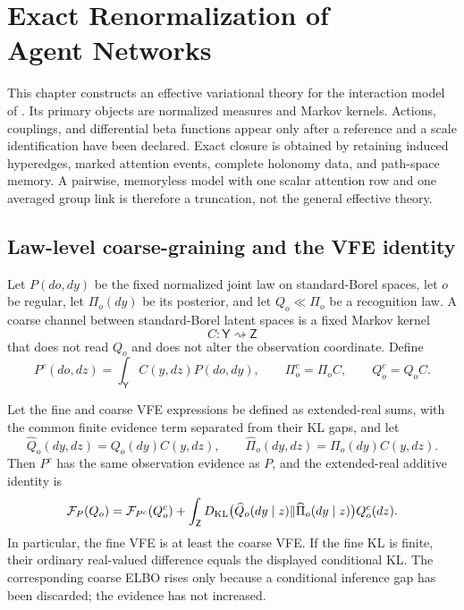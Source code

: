 \chapter[Exact Agent-Network Renormalization]{Exact Renormalization of\\Agent Networks}
\label{ch:agent-network-rg}

This chapter constructs an effective variational theory for the interaction
model of .  Its primary objects are normalized
measures and Markov kernels.  Actions, couplings, and differential beta
functions appear only after a reference and a scale identification have been
declared.  Exact closure is obtained by retaining induced hyperedges, marked
attention events, complete holonomy data, and path-space memory.  A pairwise,
memoryless model with one scalar attention row and one averaged group link is
therefore a truncation, not the general effective theory.

\section{Law-level coarse-graining and the VFE identity}
\label{sec:rg-law-level-vfe}

Let $P(do,dy)$ be the fixed normalized joint law on standard-Borel spaces, let
$o$ be regular, let $\Pi_o(dy)$ be its posterior, and let
$Q_o\ll\Pi_o$ be a recognition law.  A coarse channel between standard-Borel
latent spaces is a fixed Markov kernel
\begin{equation}
C:\mathsf Y\rightsquigarrow\mathsf Z
\label{eq:rg-coarse-channel}
\end{equation}
that does not read $Q_o$ and does not alter the observation coordinate.  Define
\begin{equation}
P^c(do,dz)=\int_{\mathsf Y}C(y,dz)P(do,dy),
\qquad
\Pi_o^c=\Pi_oC,
\qquad
Q_o^c=Q_oC.
\label{eq:rg-common-pushforward}
\end{equation}

Let the fine and coarse VFE expressions be defined as extended-real sums, with
the common finite evidence term separated from their KL gaps, and let
\begin{equation}
\widehat Q_o(dy,dz)=Q_o(dy)C(y,dz),
\qquad
\widehat\Pi_o(dy,dz)=\Pi_o(dy)C(y,dz).
\label{eq:rg-bridge-lifts}
\end{equation}
Then $P^c$ has the same observation evidence as $P$, and the extended-real
additive identity is
\begin{equation}
\mathcal F_P(Q_o)
=\mathcal F_{P^c}(Q_o^c)+\int_{\mathsf Z}
D_{\mathrm{KL}}\bigl(\widehat Q_o(dy\mid z)
\Vert\widehat\Pi_o(dy\mid z)\bigr)Q_o^c(dz)
.
\label{eq:rg-vfe-chain-rule}
\end{equation}
In particular, the fine VFE is at least the coarse VFE.  If the fine KL is
finite, their ordinary real-valued difference equals the displayed
conditional KL.
The corresponding coarse ELBO rises only because a conditional inference gap
has been discarded; the evidence has not increased.  

